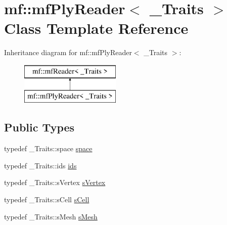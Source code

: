 \hypertarget{classmf_1_1mfPlyReader}{
\section{mf::mfPlyReader$<$ \_\-Traits $>$ Class Template Reference}
\label{classmf_1_1mfPlyReader}
}
Inheritance diagram for mf::mfPlyReader$<$ \_\-Traits $>$:\begin{figure}[H]
\begin{center}
\leavevmode
\includegraphics[height=2.000000cm]{classmf_1_1mfPlyReader}
\end{center}
\end{figure}
\subsection*{Public Types}
\begin{DoxyCompactItemize}
\item 
typedef \_\-Traits::space \hyperlink{classmf_1_1mfPlyReader_a148c30ff68212588f695b3391ec7d9f1}{space}
\item 
typedef \_\-Traits::ids \hyperlink{classmf_1_1mfPlyReader_a74dd0c085b152407ff3b92ba7bc672e5}{ids}
\item 
typedef \_\-Traits::sVertex \hyperlink{classmf_1_1mfPlyReader_a4a435b3ad40564d7b5965aad2d0ad292}{sVertex}
\item 
typedef \_\-Traits::sCell \hyperlink{classmf_1_1mfPlyReader_a4ecabd9e906019c1aac0133077fa2409}{sCell}
\item 
typedef \_\-Traits::sMesh \hyperlink{classmf_1_1mfPlyReader_ac1d8f2f32769b5966ac4da1d1c8ee66b}{sMesh}
\end{DoxyCompactItemize}
